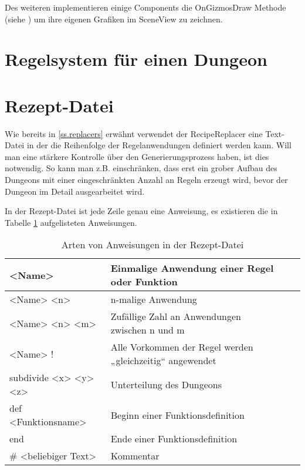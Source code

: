 Des weiteren implementieren einige Components die OnGizmosDraw Methode (siehe \cite[Seite: MonoBehaviour.OnDrawGizmos]{unitySciptingReference}) um ihre eigenen Grafiken im SceneView zu zeichnen. 


\section{Regelsystem für einen Dungeon}



\section{Rezept-Datei}\label{s.rezeptDatei}

Wie bereits in \ref{ss.replacers} erwähnt verwendet der RecipeReplacer eine Text-Datei in der die Reihenfolge der Regelanwendungen definiert werden kann. Will man eine stärkere Kontrolle über den Generierungsprozess haben, ist dies notwendig. So kann man z.B. einschränken, dass erst ein grober Aufbau des Dungeons mit einer eingeschränkten Anzahl an Regeln erzeugt wird, bevor der Dungeon im Detail ausgearbeitet wird.

In der Rezept-Datei ist jede Zeile genau eine Anweisung, es existieren die in Tabelle \ref{t.anweisungen} aufgelisteten Anweisungen.

\begin{table}[h]
    \begin{tabular}{@{}llll@{}}
        \toprule
        <Name> & Einmalige Anwendung einer Regel oder Funktion \\ \midrule
        <Name> <n> & n-malige Anwendung \\ \midrule
        <Name> <n> <m> & Zufällige Zahl an Anwendungen zwischen n und m \\ \midrule
        <Name> ! & Alle Vorkommen der Regel werden „gleichzeitig“ angewendet \\ \midrule
        subdivide <x> <y> <z> & Unterteilung des Dungeons \\ \midrule
        def <Funktionsname> & Beginn einer Funktionsdefinition \\ \midrule
        end & Ende einer Funktionsdefinition \\ \midrule
        \# <beliebiger Text> & Kommentar \\ \bottomrule
    \end{tabular}
    \caption{Arten von Anweisungen in der Rezept-Datei}
    \label{t.anweisungen}
\end{table}

